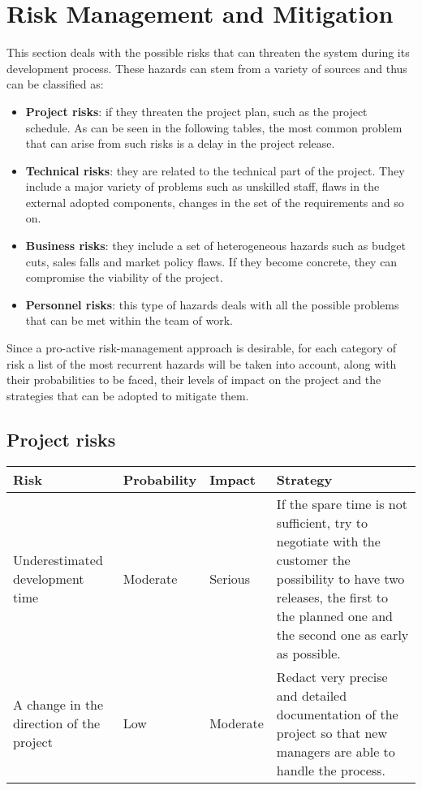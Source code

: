 \documentclass[11pt,a4paper]{report}
\begin{document}
\chapter{Risk Management and Mitigation}
This section deals with the possible risks that can threaten the system during its development process. These hazards can stem from a variety of sources and thus can be classified as:
\begin{itemize}
	\item \textbf{Project risks}: if they threaten the project plan, such as the project schedule. As can be seen in the following tables, the most common problem that can arise from such risks is a delay in the project release.
	\item \textbf{Technical risks}: they are related to the technical part of the project. They include a major variety of problems such as unskilled staff, flaws in the external adopted components, changes in the set of the requirements and so on.
	\item \textbf{Business risks}: they include a set of heterogeneous hazards such as budget cuts, sales falls and market policy flaws. If they become concrete, they can compromise the viability of the project.
	\item \textbf{Personnel risks}: this type of hazards deals with all the possible problems that can be met within the team of work.
\end{itemize}
Since a pro-active risk-management approach is desirable, for each category of risk a list of the most recurrent hazards will be taken into account, along with their probabilities to be faced, their levels of impact on the project and the strategies that can be adopted to mitigate them.
\section{Project risks}
    \begin{tabularx}{\textwidth}{ |p{3cm}|p{1.8cm}|p{1.85cm}|X|}
    \hline
    Risk & Probability & Impact & Strategy \\
    \hline
    Underestimated development time & Moderate & Serious & If the spare time is not sufficient, try to negotiate with the customer the possibility to have two releases, the first to the planned one and the second one as early as possible. \\ \hline
    A change in the direction of the project & Low & Moderate & Redact very precise and detailed documentation of the project so that new managers are able to handle the process. \\ \hline
    \end{tabularx}
\end{document}
